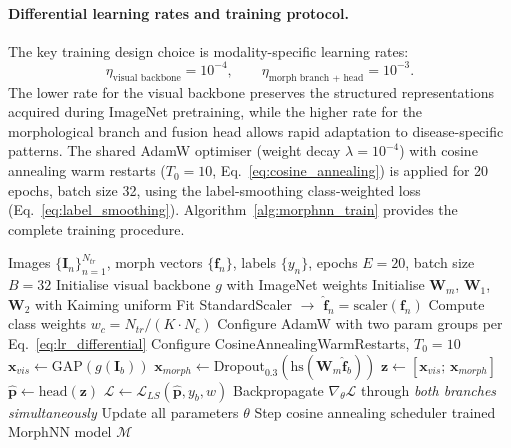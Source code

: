 \documentclass[preprint,12pt]{elsarticle}
\begin{document}
\paragraph{Differential learning rates and training protocol.}
The key training design choice is modality-specific learning rates:
\begin{equation}
  \eta_{\text{visual backbone}} = 10^{-4},\qquad
  \eta_{\text{morph branch + head}} = 10^{-3}.
  \label{eq:lr_differential}
\end{equation}
The lower rate for the visual backbone preserves the structured
representations acquired during ImageNet pretraining, while the higher
rate for the morphological branch and fusion head allows rapid
adaptation to disease-specific patterns.  The shared AdamW optimiser
(weight decay $\lambda = 10^{-4}$) with cosine annealing warm restarts
($T_0 = 10$, Eq.~\eqref{eq:cosine_annealing}) is applied for 20 epochs,
batch size 32, using the label-smoothing class-weighted loss
(Eq.~\eqref{eq:label_smoothing}).  Algorithm~\ref{alg:morphnn_train}
provides the complete training procedure.

\begin{algorithm}[htbp]
\caption{MorphNN Joint Multimodal Training}
\label{alg:morphnn_train}
\begin{algorithmic}[1]
\Require Images $\{\mathbf{I}_n\}_{n=1}^{N_{tr}}$,
         morph vectors $\{\mathbf{f}_n\}$, labels $\{y_n\}$,
         epochs $E{=}20$, batch size $B{=}32$
\State Initialise visual backbone $g$ with ImageNet weights
\State Initialise $\mathbf{W}_m$, $\mathbf{W}_1$, $\mathbf{W}_2$ with Kaiming uniform
\State Fit StandardScaler $\rightarrow$ $\hat{\mathbf{f}}_n = \text{scaler}(\mathbf{f}_n)$
\State Compute class weights $w_c = N_{tr}/(K \cdot N_c)$
\State Configure AdamW with two param groups per Eq.~\eqref{eq:lr_differential}
\State Configure CosineAnnealingWarmRestarts, $T_0{=}10$
    \State $\mathbf{x}_{vis} \leftarrow \mathrm{GAP}(g(\mathbf{I}_b))$
           \hfill{}
    \State $\mathbf{x}_{morph} \leftarrow \mathrm{Dropout}_{0.3}(\mathrm{hs}(\mathbf{W}_m\hat{\mathbf{f}}_b))$
           \hfill{}
    \State $\mathbf{z} \leftarrow [\mathbf{x}_{vis};\,\mathbf{x}_{morph}]$
           \hfill{}
    \State $\hat{\mathbf{p}} \leftarrow \text{head}(\mathbf{z})$
           \hfill{}
    \State $\mathcal{L} \leftarrow \mathcal{L}_{LS}(\hat{\mathbf{p}}, y_b, w)$
    \State Backpropagate $\nabla_\theta\mathcal{L}$ through \emph{both branches simultaneously}
    \State Update all parameters $\theta$
  \EndFor
  \State Step cosine annealing scheduler
\EndFor
\State \Return trained MorphNN model $\mathcal{M}$
\end{algorithmic}
\end{algorithm}
\end{document}
